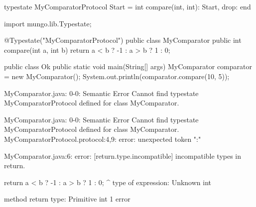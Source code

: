 \begin{code}
typestate MyComparatorProtocol {
  Start = {
    int compare(int, int): Start,
    drop: end
  }
}\end{code}

\begin{code}
import mungo.lib.Typestate;

@Typestate("MyComparatorProtocol")
public class MyComparator {
  public int compare(int a, int b) {
    return a < b ? -1 : a > b ? 1 : 0;
  }
}\end{code}

\begin{code}
public class Ok {
	public static void main(String[] args) {
		MyComparator comparator = new MyComparator();
    System.out.println(comparator.compare(10, 5));
	}
}\end{code}

\lstset{language=,caption=Mungo's output}
\begin{code}

MyComparator.java: 0-0: Semantic Error
		Cannot find typestate MyComparatorProtocol defined for class MyComparator.

MyComparator.java: 0-0: Semantic Error
		Cannot find typestate MyComparatorProtocol defined for class MyComparator.
MyComparatorProtocol.protocol:4,9: error: unexpected token ":"
\end{code}

\lstset{language=,caption=Our tool's output}
\begin{code}
MyComparator.java:6: error: [return.type.incompatible] incompatible types in return.

    return a < b ? -1 : a > b ? 1 : 0;
                 ^
  type of expression: Unknown int

  method return type: Primitive int
1 error
\end{code}

